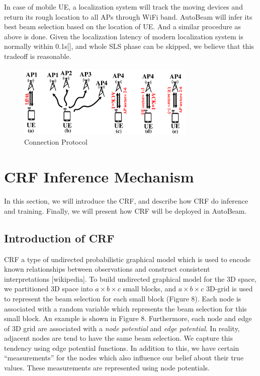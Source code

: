 \documentclass[conference]{IEEEtran}
\begin{document}
In case of mobile UE, a localization system will track the moving devices and return its rough location to all APs through WiFi band. AutoBeam will infer its best beam selection based on the location of UE. And a similar procedure as above is done. 
Given the localization latency of modern localization system is normally within 0.1s[], and whole SLS phase can be skipped, we believe that this tradeoff is reasonable. 
\begin{figure}
	\centerline{\includegraphics[width=8.5cm,height=3.5cm]{connection_protocol}}
	\caption[U-example]{Connection Protocol}
\end{figure}

\section{CRF Inference Mechanism}
In this section, we will introduce the CRF, and describe how CRF do inference and training. Finally, we will present how CRF will be deployed in AutoBeam.
\subsection{Introduction of CRF}
CRF a type of undirected probabilistic graphical model which is used to encode known relationships between observations and construct consistent interpretations [wikipedia]. To build undirected graphical model for the 3D space, we partitioned 3D space into $a\times b\times c$ small blocks, and $a\times b\times c$ 3D-grid is used to represent the beam selection for each small block (Figure 8). Each node is associated with a random variable which represents the beam selection for this small block. An example is shown in Figure 8. Furthermore, each node and edge of 3D grid are associated with a \emph{node potential} and \emph{edge potential}. In reality, adjacent nodes are tend to have the same beam selection. We capture this tendency using edge potential functions. In addition to this, we have certain “measurements” for the nodes which also influence our belief about their true values. These measurements are represented using node potentials.
\end{document}

